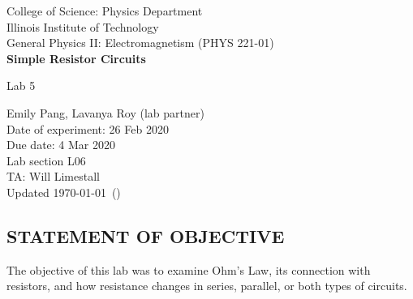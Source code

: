 \documentclass [12pt, letterpaper, twoside] {article}
\begin{document}
\begin {titlepage}
\begin {center}
College of Science: Physics Department \\
\vspace {0.1cm}
Illinois Institute of Technology\\
\vspace {0.1cm}
General Physics II: Electromagnetism (PHYS 221-01)\\
\vspace* {\fill}
\begingroup
\Large
\textbf {Simple Resistor Circuits}
\vspace {0.35cm}

\normalsize
Lab 5 
\vspace {1.5cm}
\endgroup
\vspace* {\fill}
\end {center}

\vspace*{\fill}
\begin {flushright}
\footnotesize
Emily Pang, Lavanya Roy (lab partner) \\
Date of experiment: 26 Feb 2020 \\
Due date: 4 Mar 2020 \\
Lab section L06 \\
TA: Will Limestall \\
Updated \usdate\today~(\currenttime)
\end {flushright}
\end {titlepage}
\subsection* {STATEMENT OF OBJECTIVE}
The objective of this lab was to examine Ohm's Law, its connection with resistors, and how resistance changes in series, parallel, or both types of circuits.
\end{document}
